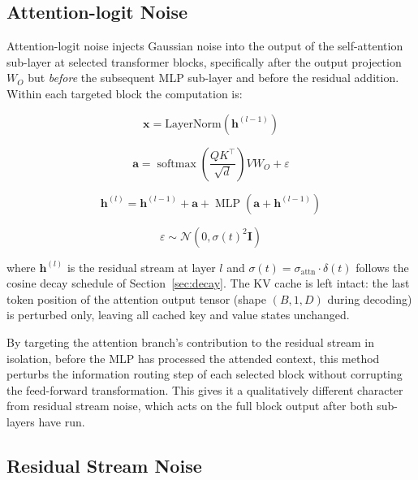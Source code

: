 \documentclass[11pt]{article}
\begin{document}
\subsection{Attention-logit Noise}

Attention-logit noise injects Gaussian noise into the output of the self-attention sub-layer at selected transformer blocks, specifically after the output projection $W_O$ but \emph{before} the subsequent MLP sub-layer and before the residual addition. Within each targeted block the computation is:

\begin{equation}
\mathbf{x} = \text{LayerNorm}(\mathbf{h}^{(l-1)})
\end{equation}

\begin{equation}
\mathbf{a} =
\operatorname{softmax}\!\left(
    \frac{QK^\top}{\sqrt{d}}
\right) V W_O + \varepsilon
\end{equation}

\begin{equation}
\mathbf{h}^{(l)} =
\mathbf{h}^{(l-1)} + \mathbf{a}
+ \operatorname{MLP}\!\left(
    \mathbf{a} + \mathbf{h}^{(l-1)}
\right)
\end{equation}

\begin{equation*}
\varepsilon \sim \mathcal{N}\!\left(
0, \sigma(t)^2 \mathbf{I}
\right)
\end{equation*}

where $\mathbf{h}^{(l)}$ is the residual stream at layer $l$ and $\sigma(t) = \sigma_{\text{attn}} \cdot \delta(t)$ follows the cosine decay schedule of Section~\ref{sec:decay}. The KV cache is left intact: the last token position of the attention output tensor (shape $(B, 1, D)$ during decoding) is perturbed only, leaving all cached key and value states unchanged.

By targeting the attention branch's contribution to the residual stream in isolation, before the MLP has processed the attended context, this method perturbs the information routing step of each selected block without corrupting the feed-forward transformation. This gives it a qualitatively different character from residual stream noise, which acts on the full block output after both sub-layers have run.

\subsection{Residual Stream Noise}
\end{document}
